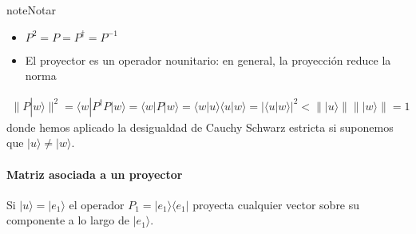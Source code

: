 \documentclass[letterpaper,10pt,english]{jupyterBook}
\newcommand{\bra}[1]{\langle #1|}
\newcommand{\ket}[1]{|#1\rangle}
\newcommand{\braket}[2]{\langle #1|#2\rangle}
\begin{document}
\begin{sphinxadmonition}{note}{Notar}
\begin{itemize}
\item {} 
\sphinxAtStartPar
\(P^2 = P = P^\dagger = P^{-1}\)

\item {} 
\sphinxAtStartPar
El proyector es un operador no\sphinxhyphen{}unitario: en general, la proyección reduce la norma

\end{itemize}
\begin{equation*}
\begin{split}
\| P\ket{w}\|^2 = \bra{w}P^\dagger P\ket{w} = \bra{w} P\ket{w}= \braket{w}{u}\braket{u}{w} = |\braket{u}{w}|^2 < \|\ket{u}\|\|\ket{w}\| = 1  
\end{split}
\end{equation*}
\sphinxAtStartPar
donde hemos aplicado la desigualdad de Cauchy Schwarz estricta si suponemos que \(\ket{u}\neq\ket{w}\).
\end{sphinxadmonition}


\paragraph{Matriz asociada a un proyector}
\label{\detokenize{docs/Part_01_Formalismo/Chapter_01_02_Formalismo_matem_xe1tico/01_03_Operadores_myst:matriz-asociada-a-un-proyector}}
\sphinxAtStartPar
Si \(\ket{u} = \ket{e_1}\) el operador \(P_1 = \ket{e_1}\bra{e_1}\) proyecta cualquier vector sobre su componente a lo largo de \(\ket{e_1}\).
\end{document}
